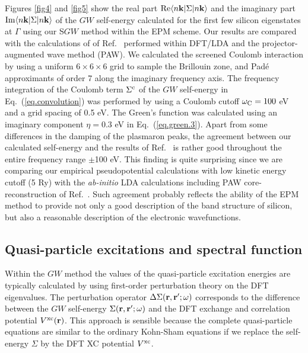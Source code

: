 \documentclass[twocolumn,prb,showpacs,superscriptaddress]{revtex4}
\def\w{\omega}
\def\wc{{\omega_{\rm C}}}
\def\k{{\bf k}}
\def\r{{\bf r}}
\def\rp{{\bf r^\prime}}
\begin{document}
Figures \ref{fig4} and \ref{fig5} show the real part ${\rm Re} \langle n\k| \Sigma|n\k\rangle$ 
and the imaginary part ${\rm Im} \langle n\k| \Sigma|n\k\rangle$ of the
$GW$ self-energy calculated for the first few silicon eigenstates at $\Gamma$
using our S$GW$ method within the EPM scheme. Our results are compared
with the calculations of of Ref.\  performed within DFT/LDA 
and the projector-augmented wave method (PAW).
We calculated the screened Coulomb interaction by using a uniform $6\times 6 \times 6$ grid 
to sample the Brillouin zone, and Pad\'e approximants of order 7 along the imaginary
frequency axis. The frequency integration of the Coulomb term $\Sigma^{\rm c}$ of the $GW$ 
self-energy in Eq.~(\ref{eq.convolution}) was performed by using a Coulomb cutoff 
$\wc = 100$ eV and a grid spacing of 0.5 eV. The Green's function was calculated
using an imaginary component $\eta = 0.3$ eV in Eq.\ (\ref{eq.green.3}).
Apart from some differences in the damping of the plasmaron peaks,
the agreement between our calculated self-energy and the results of Ref.~
is rather good throughout the entire frequency range $\pm$100 eV.
This finding is quite surprising since we are comparing our empirical pseudopotential
calculations with low kinetic energy cutoff (5 Ry) with the {\it ab-initio} LDA
calculations including PAW core-reconstruction of Ref.\ .
Such agreement probably reflects the ability of the EPM method to provide not only
a good description of the band structure of silicon, but also a reasonable
description of the electronic wavefunctions.

\subsection{Quasi-particle excitations and spectral function}\label{sec.5d}

Within the $GW$ method the values of the quasi-particle excitation energies are typically 
calculated by using first-order perturbation theory on the DFT eigenvalues.\cite{hl86}
The perturbation operator $\Delta \Sigma(\r,\rp;\w)$ corresponds to the difference between 
the $GW$ self-energy $\Sigma(\r,\rp;\w)$ and the DFT exchange and correlation potential $V^{\rm xc}(\r)$.
This approach is sensible because the complete quasi-particle equations
are similar to the ordinary Kohn-Sham equations if we replace the self-energy $\Sigma$
by the DFT XC potential $V^{\rm xc}$.\cite{hl} 
\end{document}
